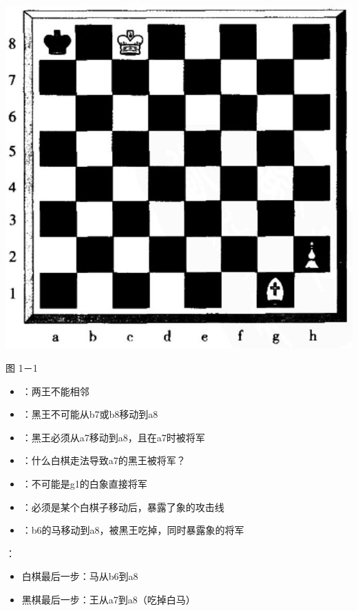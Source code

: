 \includegraphics[width=\textwidth]{images/2025_05_15_6a28331d5e7c993ad07ag-085.jpg}

图 1－1

\begin{theorembox}[title=回溯推理过程]
\begin{itemize}
  \item {}：两王不能相邻
  \item {}：黑王不可能从b7或b8移动到a8
  \item {}：黑王必须从a7移动到a8，且在a7时被将军
\end{itemize}

\begin{itemize}
  \item {}：什么白棋走法导致a7的黑王被将军？
  \item {}：不可能是g1的白象直接将军
  \item {}：必须是某个白棋子移动后，暴露了象的攻击线
  \item {}：b6的马移动到a8，被黑王吃掉，同时暴露象的将军
\end{itemize}
\end{theorembox}

：
\begin{itemize}
  \item 白棋最后一步：马从b6到a8
  \item 黑棋最后一步：王从a7到a8（吃掉白马）
\end{itemize}

